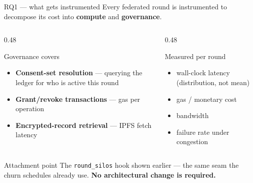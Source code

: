 \documentclass[aspectratio=169, 11pt]{beamer}
\begin{document}
\begin{frame}{RQ1 --- what gets instrumented}
Every federated round is instrumented to decompose its cost into
\textbf{compute} and \textbf{governance}.
\vspace{0.5em}
\begin{columns}[T]
\begin{column}{0.48\textwidth}
\begin{block}{Governance covers}
\begin{itemize}\small
\item \textbf{Consent-set resolution} --- querying the ledger for who is
      active this round
\item \textbf{Grant/revoke transactions} --- gas per operation
\item \textbf{Encrypted-record retrieval} --- IPFS fetch latency
\end{itemize}
\end{block}
\end{column}
\begin{column}{0.48\textwidth}
\begin{block}{Measured per round}
\begin{itemize}\small
\item wall-clock latency (distribution, not mean)
\item gas / monetary cost
\item bandwidth
\item failure rate under congestion
\end{itemize}
\end{block}
\end{column}
\end{columns}
\vspace{0.4em}
\begin{exampleblock}{Attachment point}
\small The \texttt{round\_silos} hook shown earlier --- the same seam the
churn schedules already use. \textbf{No architectural change is required.}
\end{exampleblock}
\end{frame}
\end{document}
